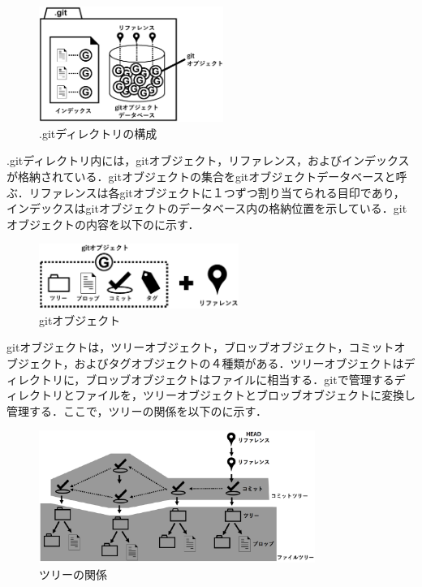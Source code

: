\documentclass[a4j,9pt,twocolumn]{jsarticle}
\begin{document}
\begin{figure}[h]
\centering
\includegraphics[width=60mm]{img/git_obj.eps}
\caption{.gitディレクトリの構成}
\label{object1}
\end{figure}

.gitディレクトリ内には，gitオブジェクト，リファレンス，およびインデックスが格納されている．gitオブジェクトの集合をgitオブジェクトデータベースと呼ぶ．リファレンスは各gitオブジェクトに１つずつ割り当てられる目印であり，インデックスはgitオブジェクトのデータベース内の格納位置を示している．gitオブジェクトの内容を以下のに示す．

\begin{figure}[h]
\centering
\includegraphics[width=65mm]{img/git_obj2.eps}
\caption{gitオブジェクト}
\label{object2}
\end{figure}

gitオブジェクトは，ツリーオブジェクト，ブロッブオブジェクト，コミットオブジェクト，およびタグオブジェクトの４種類がある．ツリーオブジェクトはディレクトリに，ブロッブオブジェクトはファイルに相当する．gitで管理するディレクトリとファイルを，ツリーオブジェクトとブロッブオブジェクトに変換し管理する．ここで，ツリーの関係を以下のに示す．

\begin{figure}[h]
\centering
\includegraphics[width=90mm]{img/tree.eps}
\caption{ツリーの関係}
\label{tree}
\end{figure}
\end{document}

